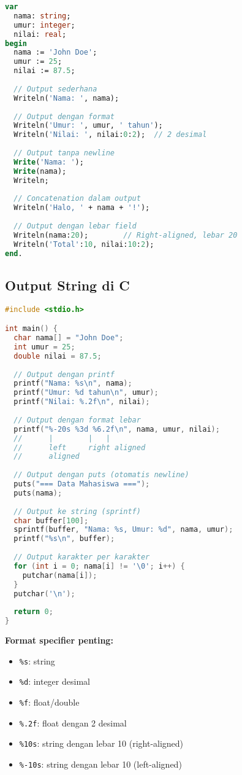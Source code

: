 \documentclass[../main.tex]{subfiles}
\begin{document}
\begin{lstlisting}[language=Pascal, caption={Output string di Pascal}]
var
  nama: string;
  umur: integer;
  nilai: real;
begin
  nama := 'John Doe';
  umur := 25;
  nilai := 87.5;
  
  // Output sederhana
  Writeln('Nama: ', nama);
  
  // Output dengan format
  Writeln('Umur: ', umur, ' tahun');
  Writeln('Nilai: ', nilai:0:2);  // 2 desimal
  
  // Output tanpa newline
  Write('Nama: ');
  Write(nama);
  Writeln;
  
  // Concatenation dalam output
  Writeln('Halo, ' + nama + '!');
  
  // Output dengan lebar field
  Writeln(nama:20);        // Right-aligned, lebar 20
  Writeln('Total':10, nilai:10:2);
end.
\end{lstlisting}

\subsection{Output String di C}

\begin{lstlisting}[language=C, caption={Output string di C}]
#include <stdio.h>

int main() {
  char nama[] = "John Doe";
  int umur = 25;
  double nilai = 87.5;
  
  // Output dengan printf
  printf("Nama: %s\n", nama);
  printf("Umur: %d tahun\n", umur);
  printf("Nilai: %.2f\n", nilai);
  
  // Output dengan format lebar
  printf("%-20s %3d %6.2f\n", nama, umur, nilai);
  //      |        |   |
  //      left     right aligned
  //      aligned  
  
  // Output dengan puts (otomatis newline)
  puts("=== Data Mahasiswa ===");
  puts(nama);
  
  // Output ke string (sprintf)
  char buffer[100];
  sprintf(buffer, "Nama: %s, Umur: %d", nama, umur);
  printf("%s\n", buffer);
  
  // Output karakter per karakter
  for (int i = 0; nama[i] != '\0'; i++) {
    putchar(nama[i]);
  }
  putchar('\n');
  
  return 0;
}
\end{lstlisting}

\textbf{Format specifier penting:}
\begin{itemize}
  \item \texttt{\%s}: string
  \item \texttt{\%d}: integer desimal
  \item \texttt{\%f}: float/double
  \item \texttt{\%.2f}: float dengan 2 desimal
  \item \texttt{\%10s}: string dengan lebar 10 (right-aligned)
  \item \texttt{\%-10s}: string dengan lebar 10 (left-aligned)
\end{itemize}
\end{document}
